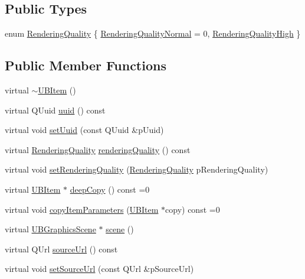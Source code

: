 \subsection*{Public Types}
\begin{DoxyCompactItemize}
\item 
enum \hyperlink{class_u_b_item_a4d073757053cafbe4f26c17ea1224d53}{Rendering\-Quality} \{ \hyperlink{class_u_b_item_a4d073757053cafbe4f26c17ea1224d53a69cf79005220669d8bc6ef771d1f4c11}{Rendering\-Quality\-Normal} =  0, 
\hyperlink{class_u_b_item_a4d073757053cafbe4f26c17ea1224d53ae16608cfe88cd2f880a850534e08ee06}{Rendering\-Quality\-High}
 \}
\end{DoxyCompactItemize}
\subsection*{Public Member Functions}
\begin{DoxyCompactItemize}
\item 
virtual \hyperlink{class_u_b_item_a069f4e36b423df18b1b4248a393e7779}{$\sim$\-U\-B\-Item} ()
\item 
virtual Q\-Uuid \hyperlink{class_u_b_item_a242c8e4390dc3244bd42023b349b042b}{uuid} () const 
\item 
virtual void \hyperlink{class_u_b_item_aebe809da60b1ea31f4c2fe612d2513e8}{set\-Uuid} (const Q\-Uuid \&p\-Uuid)
\item 
virtual \hyperlink{class_u_b_item_a4d073757053cafbe4f26c17ea1224d53}{Rendering\-Quality} \hyperlink{class_u_b_item_afd8def287752a60400e61ab7f6032d11}{rendering\-Quality} () const 
\item 
virtual void \hyperlink{class_u_b_item_ab91a4a587b0981ff59f7ddedc6dbe68c}{set\-Rendering\-Quality} (\hyperlink{class_u_b_item_a4d073757053cafbe4f26c17ea1224d53}{Rendering\-Quality} p\-Rendering\-Quality)
\item 
virtual \hyperlink{class_u_b_item}{U\-B\-Item} $\ast$ \hyperlink{class_u_b_item_a5ef870748a215b3f5f3218d0178b17b9}{deep\-Copy} () const =0
\item 
virtual void \hyperlink{class_u_b_item_a21483eccaad22369e9fe6bca838af029}{copy\-Item\-Parameters} (\hyperlink{class_u_b_item}{U\-B\-Item} $\ast$copy) const =0
\item 
virtual \hyperlink{class_u_b_graphics_scene}{U\-B\-Graphics\-Scene} $\ast$ \hyperlink{class_u_b_item_a3aacc37e7f32b28047f771d0e6abc431}{scene} ()
\item 
virtual Q\-Url \hyperlink{class_u_b_item_a00e4ed31113afaff42aa33e826b996dd}{source\-Url} () const 
\item 
virtual void \hyperlink{class_u_b_item_a4bf8fcd7a87467665279902d30d28581}{set\-Source\-Url} (const Q\-Url \&p\-Source\-Url)
\end{DoxyCompactItemize}
